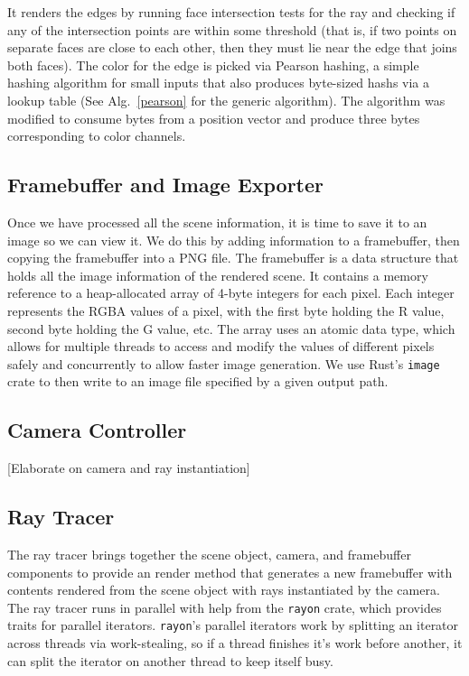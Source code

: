 \documentclass[conference]{IEEEtran}
\begin{document}
It renders the edges by running face intersection tests for the ray and checking if any of the intersection points are within some threshold (that is, if two points on separate faces are close to each other, then they must lie near the edge that joins both faces).
The color for the edge is picked via Pearson hashing, a simple hashing algorithm for small inputs that also produces byte-sized hashs via a lookup table (See Alg.~\ref{pearson} for the generic algorithm).
The algorithm was modified to consume bytes from a position vector and produce three bytes corresponding to color channels.

\subsection{Framebuffer and Image Exporter}

Once we have processed all the scene information, it is time to save it to an image so we can view it.
We do this by adding information to a framebuffer, then copying the framebuffer into a PNG file.
The framebuffer is a data structure that holds all the image information of the rendered scene.
It contains a memory reference to a heap-allocated array of 4-byte integers for each pixel.
Each integer represents the RGBA values of a pixel, with the first byte holding the R value, second byte holding the G value, etc.
The array uses an atomic data type, which allows for multiple threads to access and modify the values of different pixels safely and concurrently to allow faster image generation.
We use Rust’s \verb|image| crate to then write to an image file specified by a given output path.

\subsection{Camera Controller}

[Elaborate on camera and ray instantiation]

\subsection{Ray Tracer}

The ray tracer brings together the scene object, camera, and framebuffer components to provide an render method that generates a new framebuffer with contents rendered from the scene object with rays instantiated by the camera.
The ray tracer runs in parallel with help from the \verb|rayon| crate, which provides traits for parallel iterators.
\verb|rayon|'s parallel iterators work by splitting an iterator across threads via work-stealing, so if a thread finishes it's work before another, it can split the iterator on another thread to keep itself busy.
\end{document}
